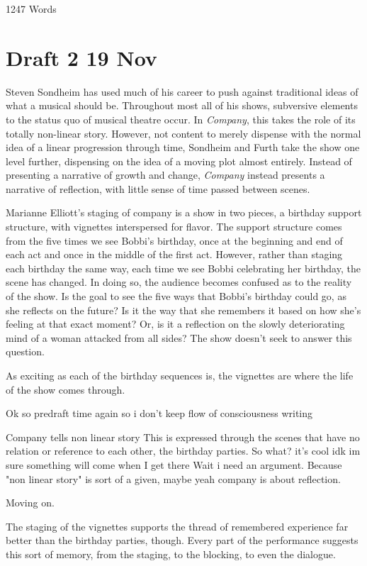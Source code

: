 \documentclass[12pt]{article}[titlepage]
\newcommand{\1}{\={a}}
\newcommand{\2}{\={e}}
\newcommand{\3}{\={\i}}
\newcommand{\4}{\=o}
\newcommand{\5}{\=u}
\newcommand{\6}{\={A}}
\renewcommand{\,}{\textsuperscript{,}}
\begin{document}
1247 Words
\section{Draft 2 19 Nov}
Steven Sondheim has used much of his career to push against traditional ideas of what a musical should be.
Throughout most all of his shows, subversive elements to the status quo of musical theatre occur.
In \textit{Company}, this takes the role of its totally non-linear story.
However, not content to merely dispense with the normal idea of a linear progression through time, Sondheim and Furth take the show one level further, dispensing on the idea of a moving plot almost entirely.
Instead of presenting a narrative of growth and change, \textit{Company} instead presents a narrative of reflection, with little sense of time passed between scenes.

Marianne Elliott's staging of company is a show in two pieces, a birthday support structure, with vignettes interspersed for flavor.
The support structure comes from the five times we see Bobbi's birthday, once at the beginning and end of each act and once in the middle of the first act.
However, rather than staging each birthday the same way, each time we see Bobbi celebrating her birthday, the scene has changed.
In doing so, the audience becomes confused as to the reality of the show.
Is the goal to see the five ways that Bobbi's birthday could go, as she reflects on the future?
Is it the way that she remembers it based on how she's feeling at that exact moment?
Or, is it a reflection on the slowly deteriorating mind of a woman attacked from all sides?
The show doesn't seek to answer this question.

As exciting as each of the birthday sequences is, the vignettes are where the life of the show comes through.


Ok so predraft time again so i don't keep flow of consciousness writing

Company tells non linear story
This is expressed through the scenes that have no relation or reference to each other, the birthday parties.
So what? it's cool idk im sure something will come when I get there
Wait i need an argument.
Because "non linear story" is sort of a given, maybe yeah company is about reflection.

Moving on.

The staging of the vignettes supports the thread of remembered experience far better than the birthday parties, though.
Every part of the performance suggests this sort of memory, from the staging, to the blocking, to even the dialogue.
\end{document}
